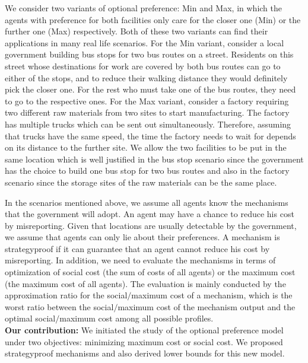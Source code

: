 \documentclass[twoside,11pt]{article}
\begin{document}
We consider two variants of optional preference: Min and Max, in which the agents with preference for both facilities only care for the closer one (Min) or the further one (Max) respectively. Both of these two variants can find their applications in many real life scenarios. For the Min variant, consider a local government building bus stops for two bus routes on a street. Residents on this street whose destinations for work are covered by both bus routes can go to either of the stops, and to reduce their walking distance they would definitely pick the closer one. For the rest who must take one of the bus routes, they need to go to the respective ones. For the Max variant, consider a factory requiring two different raw materials from two sites to start manufacturing. The factory has multiple trucks which can be sent out simultaneously. Therefore, assuming that trucks have the same speed, the time the factory needs to wait for depends on its distance to the further site. We allow the two facilities to be put in the same location which is well justified in the bus stop scenario since the government has the choice to build one bus stop for two bus routes and also in the factory scenario since the storage sites of the raw materials can be the same place.

In the scenarios mentioned above, we assume all agents know the mechanisms that the government will adopt. An agent may have a chance to reduce his cost by misreporting. Given that locations are usually detectable by the government, we assume that agents can only lie about their preferences. A mechanism is strategyproof if it can guarantee that an agent cannot reduce his cost by misreporting. In addition, we need to evaluate the mechanisms in terms of optimization of social cost (the sum of costs of all agents) or the maximum cost (the maximum cost of all agents). The evaluation is mainly conducted by the approximation ratio for the social$/$maximum cost of a mechanism, which is the worst ratio between the social$/$maximum cost of the mechanism output and the optimal social$/$maximum cost among all possible profiles.
%
\\[2ex]
\noindent\textbf{Our contribution:}
We initiated the study of the optional preference model under two objectives: minimizing maximum cost or social cost. We proposed strategyproof mechanisms and also derived lower bounds for this new model.
\end{document}
